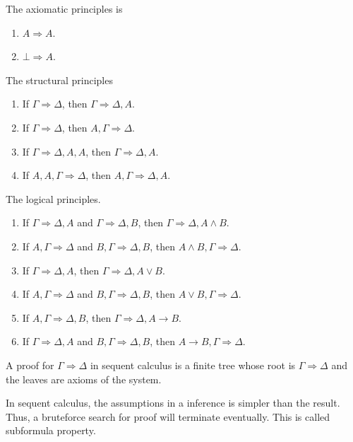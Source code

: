\begin{definition}
    The axiomatic principles is 
    \begin{enumerate}
        \item \(A \Rightarrow A\).
        \item \(\bot \Rightarrow A\).
    \end{enumerate}
    The structural principles
    \begin{enumerate}
        \item If \(\Gamma \Rightarrow \Delta\), then \(\Gamma \Rightarrow \Delta,A\).
        \item If \(\Gamma \Rightarrow \Delta\), then \(A,\Gamma \Rightarrow \Delta\).
        \item If \(\Gamma \Rightarrow \Delta,A,A\), then \(\Gamma \Rightarrow \Delta,A\).
        \item If \(A,A,\Gamma \Rightarrow \Delta\), then \(A,\Gamma \Rightarrow \Delta,A\).
    \end{enumerate}
    The logical principles.
    \begin{enumerate}
        \item If \(\Gamma \Rightarrow \Delta,A\) and \(\Gamma \Rightarrow \Delta,B\), then \(\Gamma \Rightarrow \Delta,A\land B\).
        \item If \(A,\Gamma \Rightarrow \Delta\) and \(B,\Gamma \Rightarrow \Delta,B\), then \(A\land B,\Gamma \Rightarrow \Delta\).
        \item If \(\Gamma \Rightarrow \Delta,A\), then \(\Gamma \Rightarrow \Delta,A\lor B\).
        \item If \(A,\Gamma \Rightarrow \Delta\) and \(B,\Gamma \Rightarrow \Delta,B\), then \(A\lor B,\Gamma \Rightarrow \Delta\).
        \item If \(A,\Gamma \Rightarrow \Delta,B\), then \(\Gamma \Rightarrow \Delta,A\to B\).
        \item If \(\Gamma \Rightarrow \Delta,A\) and \(B,\Gamma \Rightarrow \Delta,B\), then \(A\to B,\Gamma \Rightarrow \Delta\).
    \end{enumerate}
\end{definition}

\begin{definition}
    A proof for \(\Gamma \Rightarrow \Delta\) in sequent calculus is a finite tree whose root is \(\Gamma \Rightarrow \Delta\) and the leaves are axioms of the system.
\end{definition}

In sequent calculus, the assumptions in a inference is simpler than the result. Thus, a bruteforce search for proof will terminate eventually. This is called subformula property.

